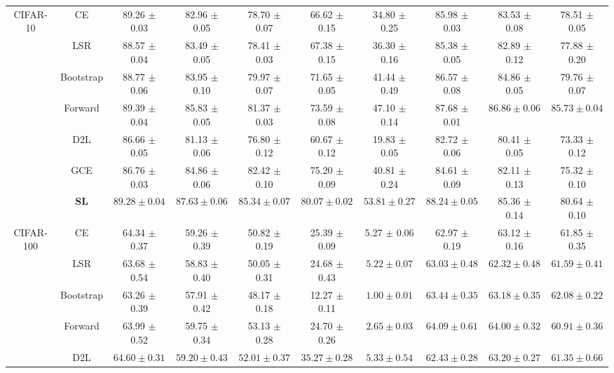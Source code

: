 \documentclass[10pt,twocolumn,letterpaper]{article}
\begin{document}
\begin{table*}[!t]
\begin{adjustbox}{width=1\textwidth}
\begin{tabular}{c|c|ccccc|ccc}
\hline
\multirow{7}{*}{CIFAR-10} & CE & 89.26 $\pm$ 0.03 & 82.96 $\pm$ 0.05 & 78.70 $\pm$ 0.07 & 66.62 $\pm$ 0.15 & 34.80 $\pm$ 0.25 & 85.98 $\pm$ 0.03 & 83.53 $\pm$ 0.08 & 78.51 $\pm$ 0.05 \\
& LSR & 88.57 $\pm$ 0.04 & 83.49 $\pm$ 0.05 & 78.41 $\pm$ 0.03 & 67.38 $\pm$ 0.15 & 36.30 $\pm$ 0.16 & 85.38 $\pm$ 0.05 & 82.89 $\pm$ 0.12 & 77.88 $\pm$ 0.20 \\
 & Bootstrap & 88.77 $\pm$ 0.06 & 83.95 $\pm$ 0.10 & 79.97 $\pm$ 0.07 & 71.65 $\pm$ 0.05 & 41.44 $\pm$ 0.49 & 86.57 $\pm$ 0.08 & 84.86 $\pm$ 0.05 & 79.76 $\pm$ 0.07 \\
 & Forward & 89.39 $\pm$ 0.04 & 85.83 $\pm$ 0.05 & 81.37 $\pm$ 0.03 & 73.59 $\pm$ 0.08 & 47.10 $\pm$ 0.14 & 87.68 $\pm$ 0.01 & $\boldsymbol{86.86 \pm 0.06}$ & $\boldsymbol{85.73 \pm 0.04}$ \\
 & D2L & 86.66 $\pm$ 0.05 & 81.13 $\pm$ 0.06 & 76.80 $\pm$ 0.12 & 60.67 $\pm$ 0.12 & 19.83 $\pm$ 0.05 & 82.72 $\pm$ 0.06 & 80.41 $\pm$ 0.05 & 73.33 $\pm$ 0.12 \\
 & GCE & 86.76 $\pm$ 0.03 & 84.86 $\pm$ 0.06 & 82.42 $\pm$ 0.10 & 75.20 $\pm$ 0.09 & 40.81 $\pm$ 0.24 & 84.61 $\pm$ 0.09 & 82.11 $\pm$ 0.13 & 75.32 $\pm$ 0.10 \\
 & \textbf{SL} & $\boldsymbol{89.28 \pm 0.04}$ & $\boldsymbol{87.63 \pm 0.06}$ & $\boldsymbol{85.34 \pm 0.07}$ & $\boldsymbol{80.07 \pm 0.02}$ & $\boldsymbol{53.81 \pm 0.27}$ & $\boldsymbol{88.24 \pm 0.05}$ & 85.36 $\pm$ 0.14 & 80.64 $\pm$ 0.10 \\ \hline
\hline
\multirow{7}{*}{CIFAR-100} & CE & 64.34 $\pm$ 0.37 & 59.26 $\pm$ 0.39 & 50.82 $\pm$ 0.19 & 25.39 $\pm$ 0.09 & 5.27 $\pm$ 0.06 & 62.97 $\pm$ 0.19 & 63.12 $\pm$ 0.16 & 61.85 $\pm$ 0.35 \\
 & LSR & 63.68 $\pm$ 0.54 & 58.83 $\pm$ 0.40 & 50.05 $\pm$ 0.31 & 24.68 $\pm$ 0.43 & $5.22 \pm 0.07$ & $63.03 \pm 0.48$ & $62.32 \pm 0.48$ & $61.59 \pm 0.41$ \\
 & Bootstrap & 63.26 $\pm$ 0.39 & 57.91 $\pm$ 0.42 & 48.17 $\pm$ 0.18 & 12.27 $\pm$ 0.11 & $1.00 \pm 0.01$ & $63.44 \pm 0.35$ & $63.18 \pm 0.35$ & $62.08 \pm 0.22$ \\
 & Forward & 63.99 $\pm$ 0.52 & 59.75 $\pm$ 0.34 & 53.13 $\pm$ 0.28 & 24.70 $\pm$ 0.26 & $2.65 \pm 0.03$ & $64.09 \pm 0.61$ & $64.00 \pm 0.32$ & $60.91 \pm 0.36$\\
 & D2L & $64.60 \pm 0.31$ & $59.20 \pm 0.43$ & $52.01 \pm 0.37$ & $35.27 \pm 0.28$ & $5.33 \pm 0.54$ & $62.43 \pm 0.28$ & $63.20 \pm 0.27$ & $61.35 \pm 0.66$ \\

\end{tabular}
\end{adjustbox}
\end{table*}
\end{document}
